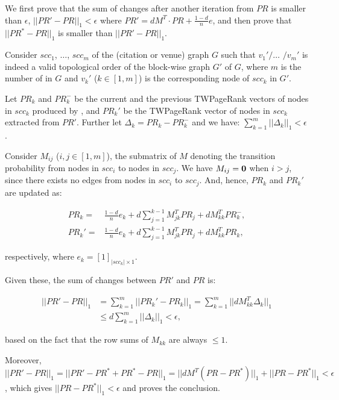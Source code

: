 \begin{proofS}
We first prove that the sum of changes after another iteration from $PR$ is smaller than $\epsilon$, \ie $||PR'-PR||_1 < \epsilon$ where $PR'=d M^T\cdot PR + \frac{1-d}{n} e$, and then prove that $||PR^*-PR||_1$ is smaller than $||PR'-PR||_1$.

Consider $scc_1$, $\dots$, $scc_m$ of the (citation or venue) graph $G$ such that $v_1'/\dots$ $/v_m'$ is indeed a valid topological order of the block-wise graph $G'$ of $G$, where $m$ is the number of \sccs in $G$ and $v_k'$ ($k\in [1,m]$) is the corresponding node of $scc_k$ in $G'$.

Let $PR_k$ and $PR_k^-$ be the current and the previous TWPageRank vectors of nodes in $scc_k$ produced
by \twprscc, and $PR_k'$ be the TWPageRank vector of nodes in $scc_k$ extracted from $PR'$.
Further let $\Delta_k=PR_k-PR^-_k$ and we have:
$\sum_{k=1}^m ||\Delta_k||_1 < \epsilon$.

Consider $M_{ij}$ ($i,j\in[1,m]$), the submatrix of $M$ denoting the transition probability from nodes in $scc_i$ to nodes in $scc_j$. We have $M_{ij}=\bf{0}$ when $i>j$, since there exists no edges from nodes in $scc_i$ to $scc_j$. And, hence, $PR_k$ and $PR_k'$ are updated as:
%
\begin{small}
\begin{equation*}
\begin{split}
PR_k=&\frac{1-d}{n} e_k+ d \sum_{j=1}^{k-1} M_{jk}^T PR_j + d M_{kk}^T PR_k^-,\\
PR_k'=&\frac{1-d}{n}  e_k+ d \sum_{j=1}^{k-1} M_{jk}^T PR_j + d M_{kk}^T PR_k,
\end{split}
\end{equation*}
\end{small}
\noindent
respectively, where $e_k=[1]_{|scc_k|\times 1}$.

\vspace{1ex}
Given these, the sum of changes between $PR'$ and $PR$ is:
%
\begin{small}
\begin{equation*}
\begin{split}
||PR'-PR||_1 & =\sum_{k=1}^m ||PR_k'-PR_k||_1 = \sum_{k=1}^m ||d M_{kk}^T \Delta_k||_1 \\
& \le d\sum_{k=1}^m ||\Delta_k||_1 < \epsilon,
\end{split}
\end{equation*}
\end{small}
\noindent
based on the fact that the row sums of $M_{kk}$ are always $\le 1$. %

Moreover, $||PR'-PR||_1 = ||PR' - PR^* + PR^* -PR||_1 = ||d M^T (PR-PR^*)||_1 + ||PR-PR^*||_1<\epsilon$, which gives $||PR-PR^*||_1<\epsilon$ and proves the conclusion.
\end{proofS}

